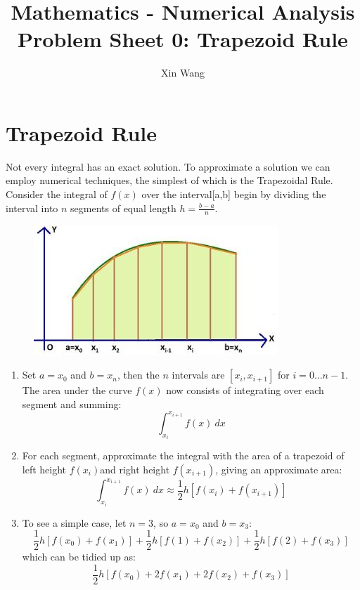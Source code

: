 \documentclass[10pt, a4paper]{article}
\begin{document}
\title{
    Mathematics - Numerical Analysis \\ \large Problem Sheet 0: Trapezoid Rule}
\author{Xin Wang}

\maketitle
\section{Trapezoid Rule}

Not every integral has an exact solution. To approximate a solution we can employ numerical
techniques, the simplest of which is the Trapezoidal Rule. Consider the integral of $f(x)$ over the
interval[a,b] begin by dividing the interval into $n$ segments of equal length $h = \frac{b-a}{n}$.
\begin{figure} [h!]
    \centering
    \includegraphics[scale=0.6]{Trapezoid.JPG}
\end{figure}

\begin{enumerate}
    \item Set $a=x_0$ and $b=x_n$, then the $n$ intervals are $[x_i,x_{i+1}]$ for $i=0\dots n-1$. The area
    under the curve $f(x)$ now consists of integrating over each segment and summing:
    $$
        \int_{x_i}^{x_{i+1}}f(x) \: dx
    $$

    \item For each segment, approximate the integral with the area of a trapezoid of left height $f(x_i)$and
    right height $f(x_{i+1})$, giving an approximate area:
    $$
        \int_{x_i}^{x_{i+1}}f(x) \: dx \approx \frac{1}{2}h[f(x_i)+f(x_{i+1})]
    $$

    \item To see a simple case, let $n=3$, so $a=x_0$ and $b=x_3$:
    $$
        \frac{1}{2}h[f(x_0)+f(x_{1})] + \frac{1}{2}h[f(1)+f(x_{2})] + \frac{1}{2}h[f(2)+f(x_{3})]
    $$
    which can be tidied up as:
    $$
        \frac{1}{2}h[f(x_0)+2f(x_1)+2f(x_2)+f(x_3)]
    $$
\end{enumerate}
\end{document}
